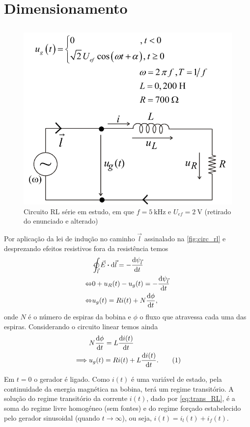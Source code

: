\documentclass[a4paper, titlepage, portuguese]{article}
\newcommand{\eq}{\Leftrightarrow} %
\newcommand\numberthis{\addtocounter{equation}{1}\tag{\theequation}}
\begin{document}

	\section{Dimensionamento}
	\subsection{}
	\subsubsection{}
		\begin{figure}[H]
			\centering
			\includegraphics[width=0.55\linewidth]{rl.png}
			\caption{Circuito RL série em estudo, em que $f = \SI{5}{\kilo\hertz}$ e $U_{ef} = \SI{2}{\volt}$ (retirado do enunciado e alterado)}
			\label{fig:circ_rl}
		\end{figure}
		\par
		Por aplicação da lei de indução no caminho $\vec{l}$ assinalado na \autoref{fig:circ_rl} e desprezando efeitos resistivos fora da resistência temos
		\begin{align*}
			&\ointclockwise_{\vec{l}} \vec{E} \vdot \dd{\vec{l}} = - \dv{\psi_{\vec{l}}}{t} \\ \eq
			&0 + u_R(t) - u_g(t) = - \dv{\psi_{\vec{l}}}{t} \\ \eq
			&u_g(t) = Ri(t) + N \dv{\phi}{t},
		\end{align*}
		onde $N$ é o número de espiras da bobina e $\phi$ o fluxo que atravessa cada uma das espiras. Considerando o circuito linear temos ainda
		\begin{align*}
			&N \dv{\phi}{t} = L \dv{i(t)}{t} \\ \implies
			&u_g(t) = Ri(t) + L \dv{i(t)}{t}. \numberthis \label{eq:trans_RL}
		\end{align*}
		\par
		Em $t = 0$ o gerador é ligado. Como $i(t)$ é uma variável de estado, pela continuidade da energia magnética na bobina, terá um regime transitório. A solução do regime transitório da corrente $i(t)$, dado por \eqref{eq:trans_RL}, é a soma do regime livre homogéneo (sem fontes) e do regime forçado estabelecido pelo gerador sinusoidal (quando $t \to \infty$), ou seja, $i(t) = i_l(t) + i_f(t)$.
\end{document}
